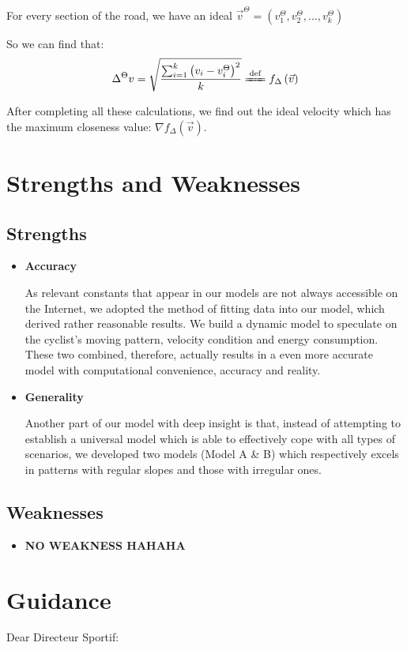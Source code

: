 \documentclass[12pt]{article}
\newcommand{\itembf}{\item \textbf}
\theoremstyle{definition}
\theoremstyle{remark}
\numberwithin{equation}{section}
\begin{document}
	 For every section of the road, we have an ideal $\vec{v}^{\Theta}=\left( v_{1}^{\Theta},v_{2}^{\Theta},...,v_{k}^{\Theta} \right) $

	 So we can find that:
	$$\Delta ^{\Theta}v=\sqrt{\frac{\sum_{i=1}^k{\left( v_i-v_{i}^{\Theta} \right) ^2}}{k}}\xlongequal{\mathrm{def}}f_{\Delta}\left( \vec{v} \right) $$

	After completing all these calculations, we find out the ideal velocity which has the maximum closeness value: $\nabla f_{\Delta}\left( \vec{v} \right) $.


	\section{Strengths and Weaknesses}
	\subsection*{Strengths}
	\begin{itemize}
		\item \textbf{Accuracy}

			As relevant constants that appear in our models are not always accessible on the Internet, we adopted the method of fitting data into our model, which derived rather reasonable results. We build a dynamic model to speculate on the cyclist's moving pattern, velocity condition and energy consumption. These two combined, therefore, actually results in a even more accurate model with computational convenience, accuracy and reality.
		\item \textbf{Generality}

			Another part of our model with deep insight is that, instead of attempting to establish a universal model which is able to effectively cope with all types of scenarios, we developed two models (Model A \& B) which respectively excels in patterns with regular slopes and those with irregular ones.
	\end{itemize}
	\subsection*{Weaknesses}
	\begin{itemize}
		\itembf{NO WEAKNESS HAHAHA}
	\end{itemize}
	\newpage
	\section{Guidance}
	Dear Directeur Sportif:
\end{document}
